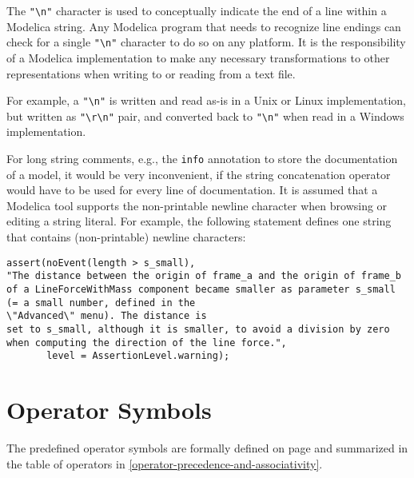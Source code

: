 The \lstinline!"\n"! character is used to conceptually indicate the end of a line within a Modelica string.
Any Modelica program that needs to recognize line endings can check for a single \lstinline!"\n"! character to do so on any platform.
It is the responsibility of a Modelica implementation to make any necessary transformations to other representations when writing to or reading from a text file.

\begin{nonnormative}
For example, a \lstinline!"\n"! is written and read as-is in a Unix or Linux implementation, but written as
\lstinline!"\r\n"! pair, and converted back to \lstinline!"\n"! when read in a Windows implementation.
\end{nonnormative}

\begin{nonnormative}
For long string comments, e.g., the \lstinline!info! annotation to store the documentation of a model, it would be very inconvenient, if the string concatenation operator would have to be used for every line of documentation.
It is assumed that a Modelica tool supports the non-printable newline character when browsing or editing a string literal.
For example, the following statement defines one string that contains (non-printable) newline characters:
\begin{lstlisting}[language=modelica]
assert(noEvent(length > s_small),
"The distance between the origin of frame_a and the origin of frame_b
of a LineForceWithMass component became smaller as parameter s_small
(= a small number, defined in the
\"Advanced\" menu). The distance is
set to s_small, although it is smaller, to avoid a division by zero
when computing the direction of the line force.",
       level = AssertionLevel.warning);
\end{lstlisting}
\end{nonnormative}


\section{Operator Symbols}\label{operator-symbols}

The predefined operator symbols are formally defined on page \pageref{lexical-conventions} and summarized in the table of operators in \cref{operator-precedence-and-associativity}.
